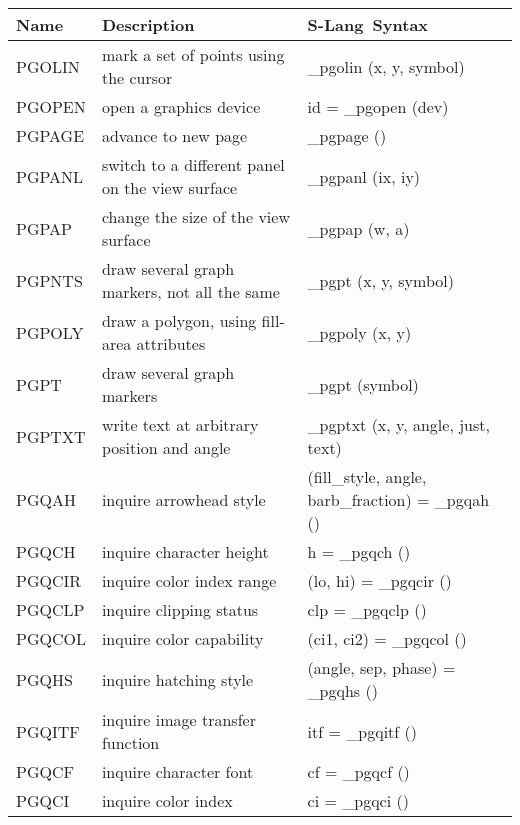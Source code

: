 \documentclass{book}
\newcommand{\slang}{{\sc S-Lang}}
\begin{document}
\begin{center}
\begin{tabular}{|l|p{2.5in}|p{2.25in}|}
\hline
Name &  Description & \slang\ Syntax \\
\hline
\hline
PGOLIN & mark a set of points using the cursor               &
\_pgolin (x, y, symbol) \\
PGOPEN & open a graphics device                                            &
id = \_pgopen (dev) \\
PGPAGE & advance to new page                                            &
\_pgpage () \\
PGPANL & switch to a different panel on the view surface                &
\_pgpanl (ix, iy) \\
PGPAP & change the size of the view surface                             &
\_pgpap (w, a) \\
PGPNTS & draw several graph markers, not all the same         &
\_pgpt (x, y, symbol) \\
PGPOLY & draw a polygon, using fill-area attributes         &
\_pgpoly (x, y) \\
PGPT & draw several graph markers                                       &
\_pgpt (symbol) \\
PGPTXT & write text at arbitrary position and angle                     &
\_pgptxt (x, y, angle, just, text) \\
PGQAH & inquire arrowhead style          &
(fill\_style, angle, barb\_fraction) = \_pgqah () \\
PGQCH & inquire character height          &
h = \_pgqch () \\
PGQCIR & inquire color index range          &
(lo, hi) = \_pgqcir () \\
PGQCLP & inquire clipping status        &
clp = \_pgqclp () \\
PGQCOL & inquire color capability        &
(ci1, ci2) = \_pgqcol () \\
PGQHS & inquire hatching style        &
(angle, sep, phase) = \_pgqhs () \\
PGQITF & inquire image transfer function &
itf = \_pgqitf () \\
PGQCF & inquire character font                                             &
cf = \_pgqcf () \\
PGQCI & inquire color index                                             &
ci = \_pgqci () \\

\end{tabular}
\end{center}
\end{document}
